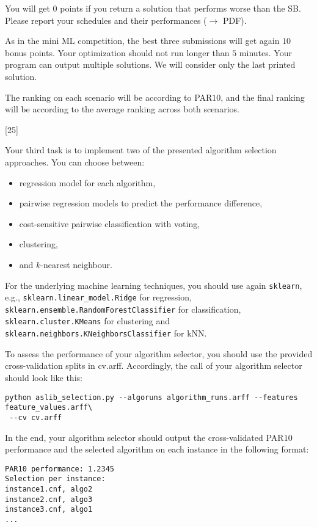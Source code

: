 \documentclass{exam}
\begin{document}
\begin{questions}
You will get $0$ points if you return a solution that performs worse than the SB.
Please report your schedules and their performances ($\to$ PDF). 

As in the mini ML competition, the best three submissions will get again $10$ bonus points.
Your optimization should not run longer than $5$ minutes. 
Your program can output multiple solutions. 
We will consider only the last printed solution.

The ranking on each scenario will be according to PAR$10$,
and the final ranking will be according to the average ranking across both scenarios.

[25]

Your third task is to implement two of the presented algorithm selection approaches. You can choose between:

\begin{itemize}
  \item regression model for each algorithm,
  \item pairwise regression models to predict the performance difference,
  \item cost-sensitive pairwise classification with voting,
  \item clustering,
  \item and $k$-nearest neighbour.
\end{itemize} 

For the underlying machine learning techniques, you should use again \texttt{sklearn},
e.g., \texttt{sklearn.linear\_model.Ridge} for regression,
\texttt{sklearn.ensemble.RandomForestClassifier} for classification,
\texttt{sklearn.cluster.KMeans} for clustering
and \texttt{sklearn.neighbors.KNeighborsClassifier} for kNN.

To assess the performance of your algorithm selector,
you should use the provided cross-validation splits in cv.arff.
Accordingly, the call of your algorithm selector should look like this:

\begin{verbatim}
python aslib_selection.py --algoruns algorithm_runs.arff --features feature_values.arff\
 --cv cv.arff
\end{verbatim}

In the end, your algorithm selector should output the cross-validated PAR$10$ performance
and the selected algorithm on each instance in the following format:

\begin{verbatim}
PAR10 performance: 1.2345
Selection per instance:
instance1.cnf, algo2
instance2.cnf, algo3
instance3.cnf, algo1
...
\end{verbatim}


\end{questions}
\end{document}
